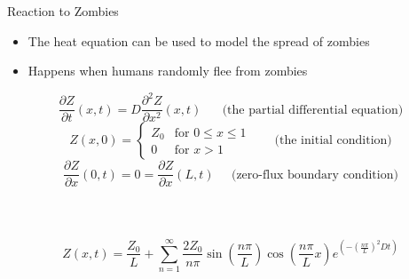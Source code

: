 \documentclass{beamer}
\begin{document}
\begin{frame}{Reaction to Zombies}
\begin{itemize}
\item The heat equation can be used to model the spread of zombies
\pause
\item Happens when humans randomly flee from zombies
\end{itemize}
\[
\frac{\partial Z}{\partial t} (x,t) =
D \frac{\partial^2 Z}{\partial x^2} (x,t) \;\;\;\;\;\; \text{(the partial differential equation)}
\]
\pause
\[
Z(x,0) = \begin{cases}
Z_0 & \text{for $0 \leq x \leq 1$}\\
0 & \text{for $x > 1$}
\end{cases} \;\;\;\;\;\;\ \text{(the initial condition)}
\]
\pause
\[
\frac{\partial Z}{\partial x} (0,t) = 0 =
\frac{\partial Z}{\partial x} (L,t) \;\;\;\;\; \text{(zero-flux boundary condition)}
\]
\noindent\\
\noindent\\
\noindent\\
\pause
\[
Z(x,t) = \frac{Z_0}{L} + \sum_{n=1}^{\infty}
\frac{2Z_0}{n \pi}\sin\left(\frac{n \pi}{L}\right)
\cos\left(\frac{n \pi}{L} x\right) e^{\left(-\left(\frac{n \pi}{L}\right)^2 Dt\right)}
\]
\end{frame}
\end{document}
